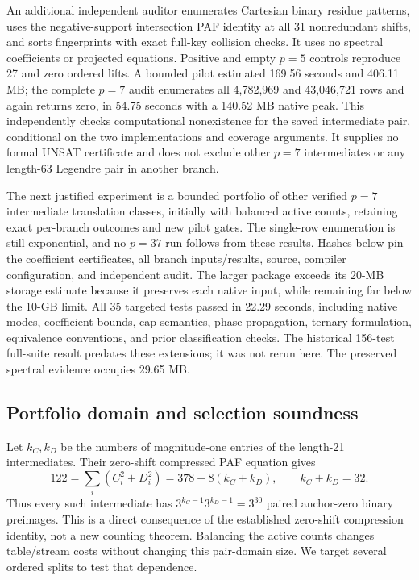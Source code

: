 \documentclass[11pt]{article}
\begin{document}
An additional independent auditor enumerates Cartesian binary residue
patterns, uses the negative-support intersection PAF identity at all 31
nonredundant shifts, and sorts fingerprints with exact full-key collision
checks. It uses no spectral coefficients or projected equations. Positive
and empty $p=5$ controls reproduce 27 and zero ordered lifts. A bounded
pilot estimated 169.56 seconds and 406.11 MB; the complete $p=7$ audit
enumerates all 4,782,969 and 43,046,721 rows and again returns zero, in
54.75 seconds with a 140.52 MB native peak. This independently checks
computational nonexistence for the saved intermediate pair, conditional
on the two implementations and coverage arguments. It supplies no formal
UNSAT certificate and does not exclude other $p=7$ intermediates or any
length-63 Legendre pair in another branch.

The next justified experiment is a bounded portfolio of other verified
$p=7$ intermediate translation classes, initially with balanced active
counts, retaining exact per-branch outcomes and new pilot gates. The
single-row enumeration is still exponential, and no $p=37$ run follows
from these results. Hashes below pin the coefficient certificates, all
branch inputs/results, source, compiler configuration, and independent
audit. The larger package exceeds its 20-MB storage estimate because it
preserves each native input, while remaining far below the 10-GB limit.
All 35 targeted tests passed in 22.29 seconds, including native modes,
coefficient bounds, cap semantics, phase propagation, ternary formulation,
equivalence conventions, and prior classification checks. The historical
156-test full-suite result predates these extensions; it was not rerun here.
The preserved spectral evidence occupies 29.65 MB.


\subsection{Portfolio domain and selection soundness}
Let $k_C,k_D$ be the numbers of magnitude-one entries of the length-21
intermediates. Their zero-shift compressed PAF equation gives
\[
 122=\sum_i(C_i^2+D_i^2)=378-8(k_C+k_D),
 \qquad k_C+k_D=32.
\]
Thus every such intermediate has $3^{k_C-1}3^{k_D-1}=3^{30}$ paired
anchor-zero binary preimages. This is a direct consequence of the established
zero-shift compression identity, not a new counting theorem. Balancing the
active counts changes table/stream costs without changing this pair-domain
size. We target several ordered splits to test that dependence.
\end{document}

